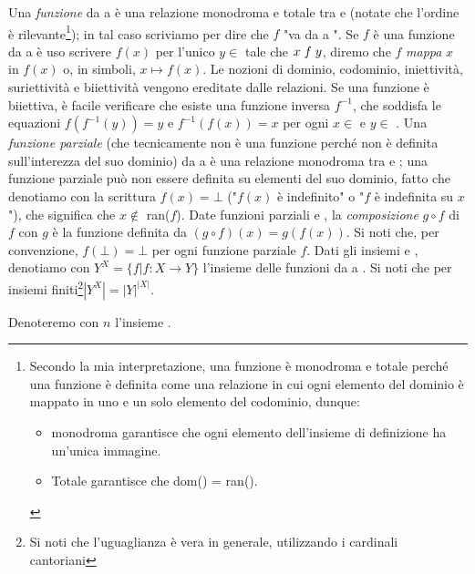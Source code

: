 Una \textit{funzione} da  a  è una relazione monodroma e totale tra  e  (notate che l'ordine è rilevante\footnote{Secondo la mia interpretazione, una funzione è monodroma e totale perché una funzione è definita come una relazione in cui ogni elemento del dominio è mappato in uno e un solo elemento del codominio, dunque:
\begin{itemize}
    \item monodroma garantisce che ogni elemento dell'insieme di definizione ha un'unica immagine.
    \item Totale garantisce che dom() = ran().
\end{itemize}}); in tal caso scriviamo  per dire che $f$ "va da  a ". Se $f$ è una funzione da  a  è uso scrivere $f(x)$ per l'unico $y \in$  tale che $x \hspace{1mm} f \hspace{1mm} y$, diremo che $f$ \textit{mappa} $x$ in $f(x)$ o, in simboli, $x \mapsto f(x)$. Le nozioni di dominio, codominio, iniettività, suriettività e biiettività vengono ereditate dalle relazioni. Se una funzione  è biiettiva, è facile verificare che esiste una funzione inversa $f^{-1}$, che soddisfa le equazioni $f(f^{-1}(y)) = y$ e $f^{-1}(f(x)) = x$ per ogni $x \in$  e $y \in$ . Una \textit{funzione parziale} (che tecnicamente non è una funzione perché non è definita sull'interezza del suo dominio) da  a  è una relazione monodroma tra  e ; una funzione parziale può non essere definita su elementi del suo dominio, fatto che denotiamo con la scrittura $f(x) = \bot$ ("$f(x)$ è indefinito" o "$f$ è indefinita su $x$"), che significa che $x \notin$ ran($f$). Date funzioni parziali  e , la \textit{composizione} $g \circ f$ di $f$ con $g$ è la funzione definita da $(g \circ f)(x) = g(f(x))$. Si noti che, per convenzione, $f(\bot) = \bot$ per ogni funzione parziale $f$. Dati gli insiemi  e , denotiamo con $Y^X = \{f | f : X \rightarrow Y\}$ l'insieme delle funzioni da  a . Si noti che per insiemi finiti\footnote{Si noti che l'uguaglianza è vera in generale, utilizzando i cardinali cantoriani}$|Y^X| = |Y|^{|X|}$.

Denoteremo con $n$ l'insieme .

